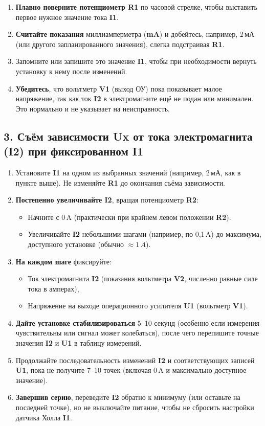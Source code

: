 \documentclass[12pt,a4paper]{article}
\begin{document}
\begin{enumerate}
    \item \textbf{Плавно поверните потенциометр R1} по часовой стрелке, чтобы выставить первое нужное значение тока \textbf{I1}. 
    \item \textbf{Считайте показания} миллиамперметра (\textbf{mA}) и добейтесь, например, 2\,мА (или другого запланированного значения), слегка подстраивая \textbf{R1}.
    \item Запомните или запишите это значение \textbf{I1}, чтобы при необходимости вернуть установку к нему после изменений.
    \item \textbf{Убедитесь}, что вольтметр \textbf{V1} (выход ОУ) пока показывает малое напряжение, так как ток \textbf{I2} в электромагните ещё не подан или минимален. Это нормально и не указывает на неисправность.
\end{enumerate}

\subsection*{3. Съём зависимости Ux от тока электромагнита (I2) при фиксированном I1}

\begin{enumerate}
    \item Установите \textbf{I1} на одном из выбранных значений (например, 2\,мА, как в пункте выше). Не изменяйте \textbf{R1} до окончания съёма зависимости.
    \item \textbf{Постепенно увеличивайте I2}, вращая потенциометр \textbf{R2}:
          \begin{itemize}
              \item Начните с 0\,A (практически при крайнем левом положении \textbf{R2}).
              \item Увеличивайте \textbf{I2} небольшими шагами (например, по 0,1\,A) до максимума, доступного установке (обычно $\approx 1\,A$).
          \end{itemize}
    \item \textbf{На каждом шаге} фиксируйте:
          \begin{itemize}
              \item Ток электромагнита \textbf{I2} (показания вольтметра \textbf{V2}, численно равные силе тока в амперах),
              \item Напряжение на выходе операционного усилителя \textbf{U1} (вольтметр \textbf{V1}).
          \end{itemize}
    \item \textbf{Дайте установке стабилизироваться} 5--10 секунд (особенно если измерения чувствительны или сигнал может колебаться), после чего перепишите точные значения \textbf{I2} и \textbf{U1} в таблицу измерений.
    \item Продолжайте последовательность изменений \textbf{I2} и соответствующих записей \textbf{U1}, пока не получите 7--10 точек (включая 0\,A и максимально доступное значение).
    \item \textbf{Завершив серию}, переведите \textbf{I2} обратно к минимуму (или оставьте на последней точке), но не выключайте питание, чтобы не сбросить настройки датчика Холла \textbf{I1}.
\end{enumerate}
\end{document}
